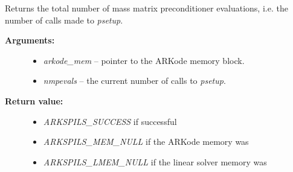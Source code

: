 \documentclass[letterpaper,10pt,english]{sphinxmanual}
\begin{document}
\begin{fulllineitems}
\label{c_interface/User_callable:ARKSpilsGetNumMassPrecEvals}
Returns the total number of mass matrix preconditioner evaluations,
i.e. the number of calls made to \emph{psetup}.
\begin{description}
\item[{\textbf{Arguments:}}] \leavevmode\begin{itemize}
\item {} 
\emph{arkode\_mem} -- pointer to the ARKode memory block.

\item {} 
\emph{nmpevals} -- the current number of calls to \emph{psetup}.

\end{itemize}

\item[{\textbf{Return value:}}] \leavevmode\begin{itemize}
\item {} 
\emph{ARKSPILS\_SUCCESS} if successful

\item {} 
\emph{ARKSPILS\_MEM\_NULL} if the ARKode memory was 

\item {} 
\emph{ARKSPILS\_LMEM\_NULL} if the linear solver memory was 

\end{itemize}

\end{description}

\end{fulllineitems}

\end{document}
